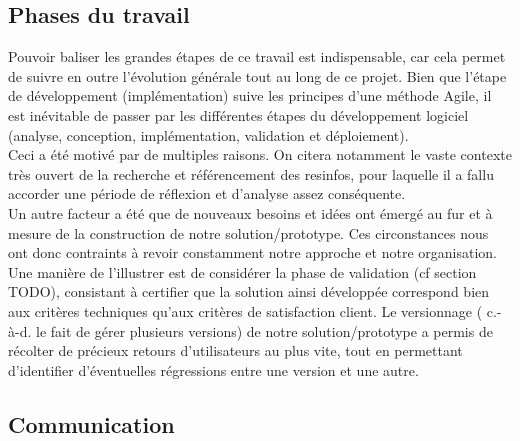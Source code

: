 \subsection*{Phases du travail}


Pouvoir baliser les grandes étapes de ce travail est indispensable, car cela permet de suivre en outre l'évolution générale tout au long de ce projet. Bien que l'étape de développement (implémentation) suive les principes d'une méthode Agile\cite{agileManifeste}, il est inévitable de passer par les différentes étapes du développement logiciel (analyse, conception, implémentation, validation et déploiement). \\

Ceci a été motivé par de multiples raisons. On citera notamment le vaste contexte très ouvert de la recherche et référencement des \glspl{resinfo}, pour laquelle il a fallu accorder une période de réflexion et d'analyse assez conséquente. \\

Un autre facteur a été que de nouveaux besoins et idées ont émergé au fur et à mesure de la construction de notre solution/prototype. Ces circonstances nous ont donc contraints à revoir constamment notre approche et notre organisation. 
Une manière de l'illustrer est de considérer la phase de validation (cf section TODO), consistant à certifier que la solution ainsi développée correspond bien aux critères techniques qu'aux critères de satisfaction client. Le versionnage ( c.-à-d. le fait de gérer plusieurs versions) de notre solution/prototype a permis de récolter de précieux retours d'utilisateurs au plus vite, tout en permettant d'identifier d'éventuelles régressions entre une version et une autre. \\

\subsection*{Communication}

